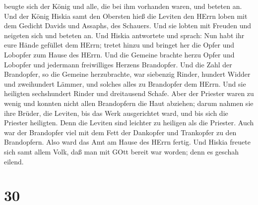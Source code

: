 beugte sich der König und alle, die bei ihm vorhanden waren, und beteten
an.  Und der König Hiskia samt den Obersten hieß die
Leviten den HErrn loben mit dem Gedicht Davids und Assaphs, des
Schauers. Und sie lobten mit Freuden und neigeten sich und beteten an.
 Und Hiskia antwortete und sprach: Nun habt ihr eure Hände
gefüllet dem HErrn; tretet hinzu und bringet her die Opfer und Lobopfer
zum Hause des HErrn. Und die Gemeine brachte herzu Opfer und Lobopfer
und jedermann freiwilliges Herzens Brandopfer.  Und die
Zahl der Brandopfer, so die Gemeine herzubrachte, war siebenzig Rinder,
hundert Widder und zweihundert Lämmer, und solches alles zu Brandopfer
dem HErrn.  Und sie heiligten sechshundert Rinder und
dreitausend Schafe.  Aber der Priester waren zu wenig und
konnten nicht allen Brandopfern die Haut abziehen; darum nahmen sie ihre
Brüder, die Leviten, bis das Werk ausgerichtet ward, und bis sich die
Priester heiligten. Denn die Leviten sind leichter zu heiligen als die
Priester.  Auch war der Brandopfer viel mit dem Fett der
Dankopfer und Trankopfer zu den Brandopfern. Also ward das Amt am Hause
des HErrn fertig.  Und Hiskia freuete sich samt allem Volk,
daß man mit GOtt bereit war worden; denn es geschah eilend.

\hypertarget{section-29}{%
\section{30}\label{section-29}}

